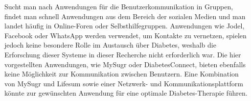 	Sucht man nach Anwendungen für die Benutzerkommunikation in Gruppen, findet man schnell Anwendungen aus dem Bereich der sozialen Medien und man landet häufig in Online-Foren oder Selbsthilfegruppen. Anwendungen wie Jodel, Facebook oder WhatsApp werden verwendet, um Kontakte zu vernetzen, spielen jedoch keine besondere Rolle im Austausch über Diabetes, weshalb die Erforschung dieser Systeme in dieser Recherche nicht erforderlich war.\newline
	Die hier vorgestellten Anwendungen, wie MySugr oder DiabetesConnect, bieten ebenfalls keine Möglichkeit zur Kommunikation zwischen Benutzern. Eine Kombination von MySugr und Lifesum sowie einer Netzwerk- und Kommunikationsplattform könnte zur gewünschten Anwendung für eine optimale Diabetes-Therapie führen.
